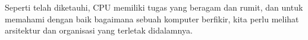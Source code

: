 Seperti telah diketauhi, CPU memiliki tugas yang beragam dan rumit, dan untuk
memahami dengan baik bagaimana sebuah komputer berfikir, kita perlu melihat
arsitektur dan organisasi yang terletak didalamnya.
